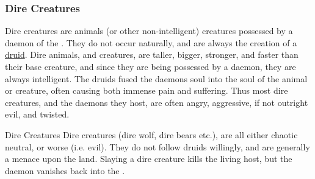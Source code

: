 \subsubsection{Dire Creatures}
\label{sec:Dire Creatures}

Dire creatures are animals (or other non-intelligent) creatures possessed by a
daemon of the . They do not occur naturally, and are
always the creation of a \hyperref[sec:Druids]{druid}. Dire animals, and
creatures, are taller, bigger, stronger, and faster than their base creature,
and since they are being possessed by a daemon, they are always
intelligent. The druids fused the daemons soul into the soul of the animal or
creature, often causing both immense pain and suffering. Thus most dire
creatures, and the daemons they host, are often angry, aggressive, if not
outright evil, and twisted.

\begin{35e}{Dire Creatures}
  Dire creatures (dire wolf, dire bears etc.), are all either chaotic neutral,
  or worse (i.e. evil). They do not follow druids willingly, and are generally
  a menace upon the land. Slaying a dire creature kills the living host, but
  the daemon vanishes back into the .
\end{35e}
